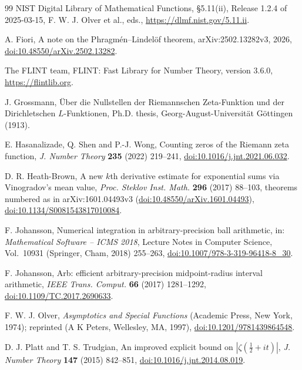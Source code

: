 \documentclass[11pt,reqno]{amsart}
\numberwithin{equation}{section}
\theoremstyle{definition}
\theoremstyle{remark}
\begin{document}
\begin{thebibliography}{99}
 NIST Digital Library of Mathematical Functions, \S5.11(ii), Release 1.2.4 of 2025-03-15, F. W. J. Olver et al., eds., \url{https://dlmf.nist.gov/5.11.ii}.

 A. Fiori, A note on the Phragm\'en--Lindel\"of theorem, arXiv:2502.13282v3, 2026, \href{https://doi.org/10.48550/arXiv.2502.13282}{doi:10.48550/arXiv.2502.13282}.

 The FLINT team, FLINT: Fast Library for Number Theory, version 3.6.0, \url{https://flintlib.org}.

 J. Grossmann, \"Uber die Nullstellen der Riemannschen Zeta-Funktion und der Dirichletschen $L$-Funktionen, Ph.D. thesis, Georg-August-Universit\"at G\"ottingen (1913).

 E. Hasanalizade, Q. Shen and P.-J. Wong, Counting zeros of the Riemann zeta function, \textit{J. Number Theory} \textbf{235} (2022) 219--241, \href{https://doi.org/10.1016/j.jnt.2021.06.032}{doi:10.1016/j.jnt.2021.06.032}.

 D. R. Heath-Brown, A new $k$th derivative estimate for exponential sums via Vinogradov's mean value, \textit{Proc. Steklov Inst. Math.} \textbf{296} (2017) 88--103, theorems numbered as in arXiv:1601.04493v3 (\href{https://doi.org/10.48550/arXiv.1601.04493}{doi:10.48550/arXiv.1601.04493}), \href{https://doi.org/10.1134/S0081543817010084}{doi:10.1134/S0081543817010084}.

 F. Johansson, Numerical integration in arbitrary-precision ball arithmetic, in: \textit{Mathematical Software -- ICMS 2018}, Lecture Notes in Computer Science, Vol.~10931 (Springer, Cham, 2018) 255--263, \href{https://doi.org/10.1007/978-3-319-96418-8_30}{doi:10.1007/978-3-319-96418-8\_30}.

 F. Johansson, Arb: efficient arbitrary-precision midpoint-radius interval arithmetic, \textit{IEEE Trans. Comput.} \textbf{66} (2017) 1281--1292, \href{https://doi.org/10.1109/TC.2017.2690633}{doi:10.1109/TC.2017.2690633}.

 F. W. J. Olver, \textit{Asymptotics and Special Functions} (Academic Press, New York, 1974); reprinted (A K Peters, Wellesley, MA, 1997), \href{https://doi.org/10.1201/9781439864548}{doi:10.1201/9781439864548}.

 D. J. Platt and T. S. Trudgian, An improved explicit bound on $|\zeta(\frac12+it)|$, \textit{J. Number Theory} \textbf{147} (2015) 842--851, \href{https://doi.org/10.1016/j.jnt.2014.08.019}{doi:10.1016/j.jnt.2014.08.019}.


\end{thebibliography}
\end{document}
